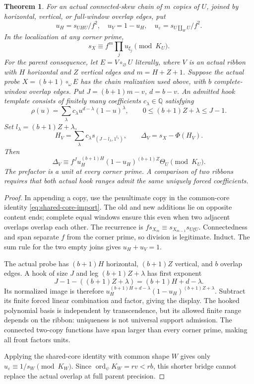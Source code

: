 \documentclass[11pt,a4paper]{amsart}
\numberwithin{equation}{section}
\theoremstyle{plain}
\newtheorem{theorem}{Theorem}[section]
\theoremstyle{definition}
\begin{document}
\begin{theorem}\label{thm:chain-transfer}
For an actual connected-skew chain of \(m\) copies of \(U\), joined by horizontal, vertical, or full-window overlap edges, put
\[
 u_H=s_{UHU}/f^2,\quad u_V=1-u_H,\quad
 u_\varepsilon=s_{U\amalg_WU}/f^2.
\]
In the localization at any corner prime,
\[
 s_X\equiv f^m\prod_j u_{\xi_j}\pmod {K_U}.
\]
For the parent consequence, let \(E=V\circ_\varnothing U\) literally, where \(V\) is an actual ribbon with \(H\) horizontal and \(Z\) vertical edges and \(m=H+Z+1\).  Suppose the actual probe \(X=(b+1)\circ_\omega E\) has the chain realization used above, with \(b\) complete-window overlap edges.  Put \(J=(b+1)m-v\), \(d=b-v\).  An admitted hook template consists of finitely many coefficients \(c_\lambda\in\mathbb Q\) satisfying
\[
 \rho(u)=\sum_\lambda c_\lambda u^{d-\lambda}(1-u)^\lambda,
 \qquad 0\le (b+1)Z+\lambda\le J-1.
\]
Set \(l_\lambda=(b+1)Z+\lambda\),
\[
 H_V=\sum_\lambda c_\lambda s_{(J-l_\lambda,1^{l_\lambda})},
 \qquad\Delta_V=s_X-\Phi(H_V).
\]
Then
\[
 \Delta_V\equiv f^J u_H^{(b+1)H}(1-u_H)^{(b+1)Z}\Theta_U\pmod {K_U}.
\]
The prefactor is a unit at every corner prime.  A comparison of two ribbons requires that both actual hook ranges admit the same uniquely forced coefficients.
\end{theorem}
\begin{proof}
In appending a copy, use the penultimate copy in the common-core identity \eqref{eq:shared-core-import}.  The old and new additions lie on opposite content ends; complete equal windows ensure this even when two adjacent overlaps overlap each other.  The recurrence is \(f s_{X_m}\equiv s_{X_{m-1}}s_{U\xi U}\).  Connectedness and span separate \(f\) from the corner prime, so division is legitimate.  Induct.  The sum rule for the two empty joins gives \(u_H+u_V=1\).

The actual probe has \((b+1)H\) horizontal, \((b+1)Z\) vertical, and \(b\) overlap edges.  A hook of size \(J\) and leg \((b+1)Z+\lambda\) has first exponent
\[
 J-1-((b+1)Z+\lambda)=(b+1)H+d-\lambda.
\]
Its normalized image is therefore \(u_H^{(b+1)H+d-\lambda}(1-u_H)^{(b+1)Z+\lambda}\).  Subtract its finite forced linear combination and factor, giving the display.  The hooked polynomial basis is independent by transcendence, but its allowed finite range depends on the ribbon: uniqueness is not universal support admission.  The connected two-copy functions have span larger than every corner prime, making all front factors units.

Applying the shared-core identity with common shape \(W\) gives only
\(u_\varepsilon\equiv1/s_W\pmod {K_W}\).
Since \(\operatorname{ord}_\psi K_W=rv<rb\), this shorter bridge cannot replace the actual overlap at full parent precision.
\end{proof}
\end{document}
